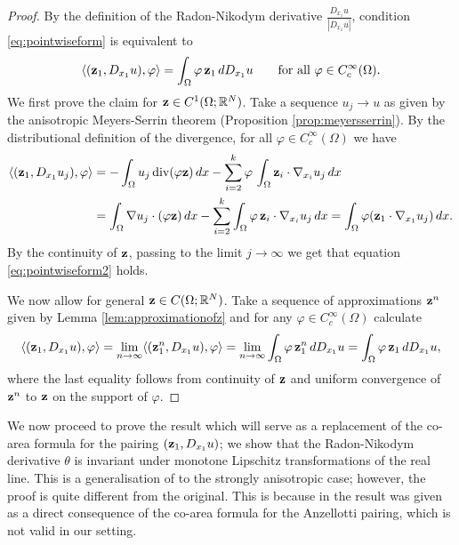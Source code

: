 \documentclass[reqno,12pt]{amsart}
\def\z{{\bf z}}
\numberwithin{equation}{section}
\begin{document}
\begin{proof}
By the definition of the Radon-Nikodym derivative $\frac{D_{x_1} u}{|D_{x_1} u|}$, condition \eqref{eq:pointwiseform} is equivalent to
\begin{equation}\label{eq:pointwiseform2}
\langle (\z_1, D_{x_1} u), \varphi \rangle = \int_\Omega \varphi \, \z_1 \, dD_{x_1} u \qquad \mbox{for all } \varphi \in C_c^\infty(\Omega).
\end{equation}
We first prove the claim for $\z \in C^1(\Omega; \mathbb{R}^N)$. Take a sequence $u_j \rightarrow u$ as given by the anisotropic Meyers-Serrin theorem (Proposition \ref{prop:meyersserrin}). By the distributional definition of the divergence, for all $\varphi \in C_c^\infty(\Omega)$ we have
\begin{align}
\langle (\z_1, D_{x_1} u_j), \varphi \rangle &= -\int_{\Omega} u_j \, \mathrm{div}(\varphi \z) \, dx - \sum_{i=2}^k \varphi \, \int_\Omega \z_i \cdot \nabla_{x_i} u_j \, dx  \\ 
&=  \int_{\Omega} \nabla u_j \cdot (\varphi \z) \, dx - \sum_{i=2}^k \int_\Omega \varphi \, \z_i \cdot \nabla_{x_i} u_j \, dx  = \int_{\Omega} \varphi (\z_1 \cdot \nabla_{x_1} u_j) \, dx.
\end{align}
By the continuity of $\z$, passing to the limit $j \rightarrow \infty$ we get that equation \eqref{eq:pointwiseform2} holds.

We now allow for general $\z \in C(\Omega; \mathbb{R}^N)$. Take a sequence of approximations $\z^n$ given by Lemma \ref{lem:approximationofz} and for any $\varphi \in C_c^\infty(\Omega)$ calculate
\begin{equation}
\langle (\z_1, D_{x_1} u), \varphi \rangle = \lim_{n \rightarrow \infty} \langle (\z_1^n, D_{x_1} u), \varphi \rangle = \lim_{n \rightarrow \infty} \int_\Omega \varphi \, \z_1^n \, dD_{x_1} u = \int_\Omega \varphi \, \z_1 \, dD_{x_1} u,
\end{equation}
where the last equality follows from continuity of $\z$ and uniform convergence of $\z^n$ to $\z$ on the support of $\varphi$.
\end{proof}

We now proceed to prove the result which will serve as a replacement of the co-area formula for the pairing $(\z_1, D_{x_1} u)$; we show that the Radon-Nikodym derivative $\theta$ is invariant under monotone Lipschitz transformations of the real line. This is a generalisation of \cite[Proposition 2.8]{Anzellotti} to the strongly anisotropic case; however, the proof is quite different from the original. This is because in \cite{Anzellotti} the result was given as a direct consequence of the co-area formula for the Anzellotti pairing, which is not valid in our setting.
\end{document}
